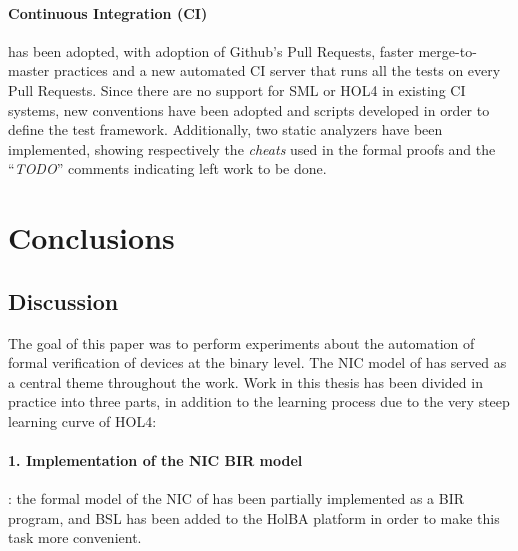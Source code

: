 \documentclass[10pt,a4paper]{article}
\begin{document}
\begin{multicols}{2}
\vspace{-8pt}
\paragraph{Continuous Integration (CI)} has been adopted, with adoption of Github's Pull Requests, faster merge-to-master practices and a new automated CI server that runs all the tests on every Pull Requests. Since there are no support for SML or HOL4 in existing CI systems, new conventions have been adopted and scripts developed in order to define the test framework. Additionally, two static analyzers have been implemented, showing respectively the \textit{cheats} used in the formal proofs and the ``\textit{TODO}'' comments indicating left work to be done.


\section{Conclusions}

\subsection{Discussion}

The goal of this paper was to perform experiments about the automation of formal verification of devices at the binary level. The NIC model of \cite{haglund_formal_2016} has served as a central theme throughout the work. Work in this thesis has been divided in practice into three parts, in addition to the learning process due to the very steep learning curve of HOL4:

\vspace{-8pt}
\paragraph{1. Implementation of the NIC BIR model}: the formal model of the NIC of \cite{haglund_formal_2016} has been partially implemented as a BIR program, and BSL has been added to the HolBA platform in order to make this task more convenient.

\vspace{-8pt}

\end{multicols}
\end{document}
